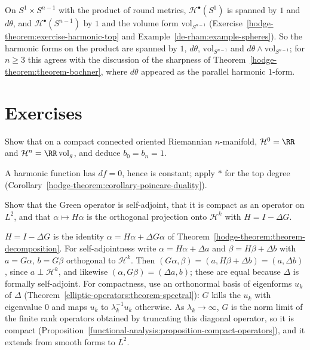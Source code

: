 \begin{example}\label{hodge-theorem:example-products}
On $S^1 \times S^{n-1}$ with the product of round metrics, $\mathcal{H}^\bullet(S^1)$ is spanned by $1$ and $d\theta$, and $\mathcal{H}^\bullet(S^{n-1})$ by $1$ and the volume form $\mathrm{vol}_{S^{n-1}}$ (Exercise~\ref{hodge-theorem:exercise-harmonic-top}
and Example~\ref{de-rham:example-spheres}). So the harmonic forms on the product are spanned by $1$, $d\theta$, $\mathrm{vol}_{S^{n-1}}$ and $d\theta \wedge \mathrm{vol}_{S^{n-1}}$; for $n \geq 3$ this agrees with the
discussion of the sharpness of Theorem~\ref{hodge-theorem:theorem-bochner}, where $d\theta$ appeared as the parallel harmonic $1$-form.
\end{example}

\section{Exercises}\label{hodge-theorem:section-exercises}

\begin{exercise}\label{hodge-theorem:exercise-harmonic-top}
Show that on a compact connected oriented Riemannian $n$-manifold, $\mathcal{H}^0 = \RR$ and $\mathcal{H}^n = \RR\,\mathrm{vol}_g$, and deduce $b_0 = b_n = 1$.
\end{exercise}

\begin{solution}
A harmonic function has $df = 0$, hence is constant; apply $*$ for the top degree (Corollary~\ref{hodge-theorem:corollary-poincare-duality}).
\end{solution}

\begin{exercise}\label{hodge-theorem:exercise-green-properties}
Show that the Green operator is self-adjoint, that it is compact as an operator on $L^2$, and that $\alpha \mapsto H\alpha$ is the orthogonal projection onto $\mathcal{H}^k$ with $H = I - \Delta G$.
\end{exercise}

\begin{solution}
$H = I - \Delta G$ is the identity $\alpha = H\alpha + \Delta G\alpha$ of Theorem~\ref{hodge-theorem:theorem-decomposition}. For self-adjointness write $\alpha = H\alpha + \Delta a$ and $\beta = H\beta + \Delta b$
with $a = G\alpha$, $b = G\beta$ orthogonal to $\mathcal{H}^k$. Then $(G\alpha, \beta) = (a, H\beta + \Delta b) = (a, \Delta b)$, since $a \perp \mathcal{H}^k$, and likewise $(\alpha, G\beta) = (\Delta a, b)$; these are equal because
$\Delta$ is formally self-adjoint. For compactness, use an orthonormal basis of eigenforms $u_k$ of $\Delta$ (Theorem~\ref{elliptic-operators:theorem-spectral}): $G$ kills the $u_k$ with eigenvalue $0$ and maps
$u_k$ to $\lambda_k^{-1}u_k$ otherwise. As $\lambda_k \to \infty$, $G$ is the norm limit of the finite rank operators obtained by truncating this diagonal operator, so it is compact
(Proposition~\ref{functional-analysis:proposition-compact-operators}), and it extends from smooth forms to $L^2$.
\end{solution}

